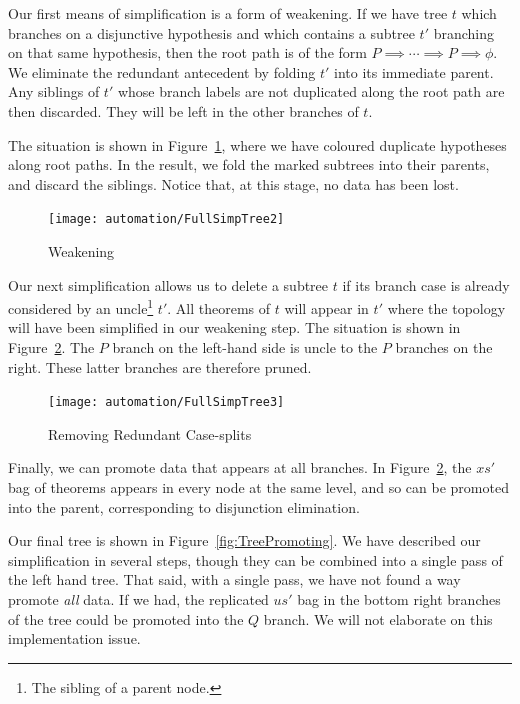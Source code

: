 Our first means of simplification is a form of weakening. If we have tree $t$ which branches on a disjunctive hypothesis and which contains a subtree $t'$ branching on that same hypothesis, then the root path is of the form $P \implies \cdots \implies P \implies \phi$. We eliminate the redundant antecedent by folding $t'$ into its immediate parent. Any siblings of $t'$ whose branch labels are not duplicated along the root path are then discarded. They will be left in the other branches of $t$.

The situation is shown in Figure~\ref{fig:TreeWeakening}, where we have coloured duplicate hypotheses along root paths. In the result, we fold the marked subtrees into their parents, and discard the siblings. Notice that, at this stage, no data has been lost.

\begin{figure}
\centering\texttt{[image: automation/FullSimpTree2]}
\caption{Weakening}
\label{fig:TreeWeakening}
\end{figure}

Our next simplification allows us to delete a subtree $t$ if its branch case is already considered by an uncle\footnote{The sibling of a parent node.} $t'$. All theorems of $t$ will appear in $t'$ where the topology will have been simplified in our weakening step. The situation is shown in Figure~\ref{fig:TreeRedundantSplits}. The $P$ branch on the left-hand side is uncle to the $P$ branches on the right. These latter branches are therefore pruned.

\begin{figure}
\centering\texttt{[image: automation/FullSimpTree3]}
\caption{Removing Redundant Case-splits}
\label{fig:TreeRedundantSplits}
\end{figure}

Finally, we can promote data that appears at all branches. In Figure~\ref{fig:TreeRedundantSplits}, the $xs'$ bag of theorems appears in every node at the same level, and so can be promoted into the parent, corresponding to disjunction elimination. 

Our final tree is shown in Figure~\ref{fig:TreePromoting}. We have described our simplification in several steps, though they can be combined into a single pass of the left hand tree. That said, with a single pass, we have not found a way promote \emph{all} data. If we had, the replicated $us'$ bag in the bottom right branches of the tree could be promoted into the $Q$ branch. We will not elaborate on this implementation issue.

